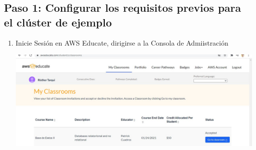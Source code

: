 \documentclass[12pt,letterpaper]{article}
\begin{document}
	
	\subsection{Paso 1: Configurar los requisitos previos para el clúster de ejemplo}
	
	\begin{enumerate}
		
		\item Inicie Sesión en AWS Educate, dirigirse a la Consola de Admiistración
		\begin{center}
			\includegraphics[width=14cm]{./img/1.1.jpg} 
		\end{center}
		

\end{enumerate}
\end{document}
